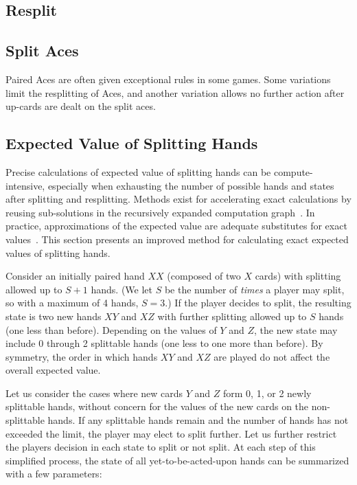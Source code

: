 
\subsection{Resplit}
\label{sec:basic:resplit}


\subsection{Split Aces}
\label{sec:basic:split-aces}

Paired Aces are often given exceptional rules in some games.
Some variations limit the resplitting of Aces, 
and another variation allows no further action after
up-cards are dealt on the split aces.  

\subsection{Expected Value of Splitting Hands}
\label{sec:basic:split:calc}

Precise calculations of expected value of splitting hands can be 
compute-intensive, especially when exhausting the number of 
possible hands and states after splitting and resplitting.
Methods exist for accelerating exact calculations by 
reusing sub-solutions in the recursively expanded 
computation graph~\cite{ref:nairn08}.
In practice, approximations of the expected value are adequate 
substitutes for exact values~\cite{ref:griffin99}.  
This section presents an improved method for calculating exact 
expected values of splitting hands.

Consider an initially paired hand $XX$ (composed of two $X$ cards)
with splitting allowed up to $S+1$ hands.
(We let $S$ be the number of \emph{times} a player may split, 
so with a maximum of 4 hands, $S=3$.)
If the player decides to split, the resulting state is
two new hands $XY$ and $XZ$ with further splitting allowed up to $S$ hands 
(one less than before).  
Depending on the values of $Y$ and $Z$, the new state may include 
0 through 2 splittable hands (one less to one more than before).  
By symmetry, the order in which hands $XY$ and $XZ$ are played 
do not affect the overall expected value.  

Let us consider the cases where new cards
$Y$ and $Z$ form 0, 1, or 2 newly splittable hands, 
without concern for the values of the new cards on the non-splittable hands.
If any splittable hands remain and the number of hands has not exceeded
the limit, the player may elect to split further.
Let us further restrict the players decision in each state to 
split or not split.
At each step of this simplified process, 
the state of all yet-to-be-acted-upon hands can be 
summarized with a few parameters:

